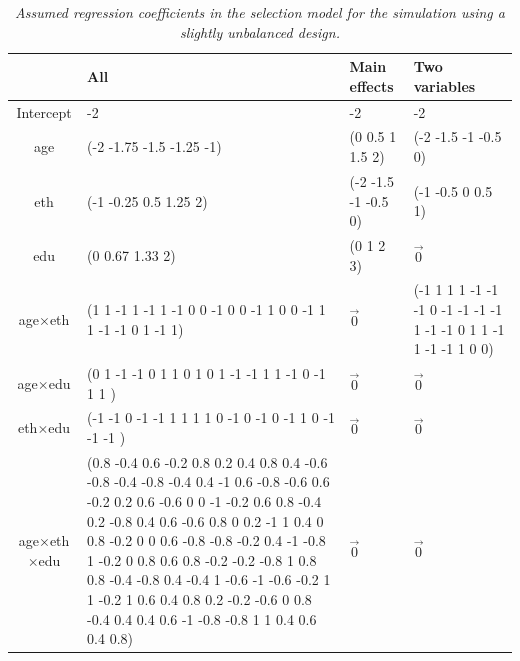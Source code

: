 \documentclass[11pt]{article}
\begin{document}
\begin{table}
\begin{center}
\footnotesize
\begin{tabular}{c|p{4cm}|l|p{4cm}}
&All&Main effects & Two variables\\
\hline
Intercept&-2&-2&-2\\
age&(-2 -1.75 -1.5 -1.25 -1)&(0 0.5 1 1.5 2)&(-2 -1.5 -1 -0.5 0)\\
eth&(-1 -0.25 0.5 1.25 2)&(-2 -1.5 -1 -0.5 0)&(-1 -0.5 0 0.5 1)\\
edu&(0 0.67 1.33 2)&(0 1 2 3)& $\vec{0}$\\
age$\times$eth&(1 1 -1 1 -1 1 -1 0 0 -1 0 0 -1 1 0 0 -1 1 1 -1 -1 0 1 -1 1)& $\vec{0}$&(-1 1 1 1 -1 -1 -1 0 -1 -1 -1 -1 1 -1 -1 0 1 1 -1 1 -1 -1 1 0 0)\\
age$\times$edu&(0 1 -1 -1 0 1 1 0 1 0 1 -1 -1 1 1 -1 0 -1 1 1 )& $\vec{0}$& $\vec{0}$\\
eth$\times$edu&(-1 -1 0 -1 -1 1 1 1 1 0 -1 0 -1 0 -1 1 0 -1 -1 -1 )& $\vec{0}$& $\vec{0}$\\
age$\times$eth$\times$edu& (0.8 -0.4 0.6 -0.2 0.8 0.2 0.4 0.8 0.4 -0.6 -0.8 -0.4 -0.8 -0.4 0.4 -1 0.6 -0.8 -0.6 0.6 -0.2 0.2 0.6 -0.6 0 0 -1 -0.2 0.6 0.8 -0.4 0.2 -0.8 0.4 0.6 -0.6 0.8 0 0.2 -1 1 0.4 0 0.8 -0.2 0 0 0.6 -0.8 -0.8 -0.2 0.4 -1 -0.8 1 -0.2 0 0.8 0.6 0.8 -0.2 -0.2 -0.8 1 0.8 0.8 -0.4 -0.8 0.4 -0.4 1 -0.6 -1 -0.6 -0.2 1 1 -0.2 1 0.6 0.4 0.8 0.2 -0.2 -0.6 0 0.8 -0.4 0.4 0.4 0.6 -1 -0.8 -0.8 1 1 0.4 0.6 0.4 0.8)&$\vec{0}$& $\vec{0}$
\end{tabular}
\end{center}
\caption{\em Assumed regression coefficients in the {\em selection}  model for the simulation using a slightly unbalanced design.}
\label{s1-selection-coef}
\end{table}
\end{document}
